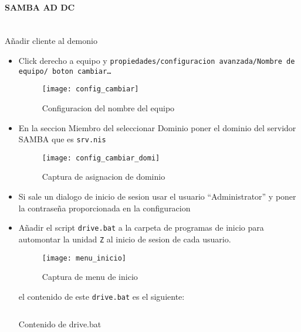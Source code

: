 \documentclass[../main.tex]{subfiles}
\begin{document}
\newpage{}
\paragraph{SAMBA AD DC}\ \\Añadir cliente al demonio
\begin{itemize}
  \item Click derecho a equipo y \texttt{propiedades/configuracion avanzada/Nombre de equipo/ boton cambiar\ldots}
        \begin{figure}[H]
          \centering
          \texttt{[image: config\_cambiar]}
          \caption{Configuracion del nombre del equipo}\label{fig:config_cambiar}
        \end{figure}
        \newpage{}

  \item En la seccion Miembro del seleccionar Dominio poner el dominio del servidor SAMBA que es \texttt{srv.nis}
        \begin{figure}[H]
          \centering
          \texttt{[image: config\_cambiar\_domi]}
          \caption{Captura de asignacion de dominio}\label{fig:config_cambiar_domi}
        \end{figure}
        \newpage{}
  \item Si sale un dialogo de inicio de sesion usar el usuario ``Administrator''
        y poner la contraseña proporcionada en la configuracion
  \item Añadir el script \texttt{drive.bat} a la carpeta de programas
        de inicio para automontar la unidad \texttt{Z} al inicio de sesion de
        cada usuario.
        \begin{figure}[H]
          \centering
          \texttt{[image: menu\_inicio]}
          \caption{Captura de menu de inicio}\label{fig:menu_inicio}
        \end{figure}

        el contenido de este \texttt{drive.bat} es el siguiente:


        \begin{listing}[H]
          \inputminted{bat}{../configs/drive.bat}
          \caption{Contenido de drive.bat}
          \label{listing:drive.sh}
        \end{listing}



\end{itemize}
\end{document}
